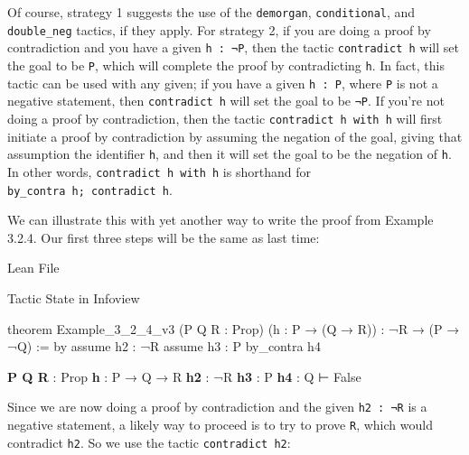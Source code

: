 \documentclass[
  letterpaper,
  DIV=11,
  numbers=noendperiod]{scrreprt}
\newenvironment{Shaded}{\begin{snugshade}}{\end{snugshade}}
\newcommand{\InformationTok}[1]{\textcolor[rgb]{0.37,0.37,0.37}{#1}}
\newcommand{\KeywordTok}[1]{\textcolor[rgb]{0.00,0.23,0.31}{#1}}
\newcommand{\NormalTok}[1]{\textcolor[rgb]{0.00,0.23,0.31}{#1}}
\renewcommand{\KeywordTok}[1]{\textcolor[HTML]{0000FF}{#1}}
\renewcommand{\InformationTok}[1]{\textcolor[HTML]{D2691E}{\textbf{#1}}}
\begin{document}
Of course, strategy 1 suggests the use of the \texttt{demorgan},
\texttt{conditional}, and \texttt{double\_neg} tactics, if they apply.
For strategy 2, if you are doing a proof by contradiction and you have a
given \texttt{h\ :\ ¬P}, then the tactic \texttt{contradict\ h} will set
the goal to be \texttt{P}, which will complete the proof by
contradicting \texttt{h}. In fact, this tactic can be used with any
given; if you have a given \texttt{h\ :\ P}, where \texttt{P} is not a
negative statement, then \texttt{contradict\ h} will set the goal to be
\texttt{¬P}. If you're not doing a proof by contradiction, then the
tactic \texttt{contradict\ h\ with\ h\textquotesingle{}} will first
initiate a proof by contradiction by assuming the negation of the goal,
giving that assumption the identifier \texttt{h\textquotesingle{}}, and
then it will set the goal to be the negation of \texttt{h}. In other
words, \texttt{contradict\ h\ with\ h\textquotesingle{}} is shorthand
for \texttt{by\_contra\ h\textquotesingle{};\ contradict\ h}.

We can illustrate this with yet another way to write the proof from
Example 3.2.4. Our first three steps will be the same as last time:

Lean File

Tactic State in Infoview

\begin{Shaded}
\begin{Highlighting}[]
\KeywordTok{theorem}\NormalTok{ Example\_3\_2\_4\_v3 (P Q R : }\KeywordTok{Prop}\NormalTok{)}
\NormalTok{(h : P → (Q → R)) : ¬R → (P → ¬Q) := }\KeywordTok{by}
  \KeywordTok{assume}\NormalTok{ h2 : ¬R}
  \KeywordTok{assume}\NormalTok{ h3 : P}
  \KeywordTok{by\_contra}\NormalTok{ h4}
\end{Highlighting}
\end{Shaded}

\begin{Shaded}
\begin{Highlighting}[]
\InformationTok{P Q R }\NormalTok{: Prop}
\InformationTok{h }\NormalTok{: P → Q → R}
\InformationTok{h2 }\NormalTok{: ¬R}
\InformationTok{h3 }\NormalTok{: P}
\InformationTok{h4 }\NormalTok{: Q}
\NormalTok{⊢ False}
\end{Highlighting}
\end{Shaded}

Since we are now doing a proof by contradiction and the given
\texttt{h2\ :\ ¬R} is a negative statement, a likely way to proceed is
to try to prove \texttt{R}, which would contradict \texttt{h2}. So we
use the tactic \texttt{contradict\ h2}:
\end{document}
